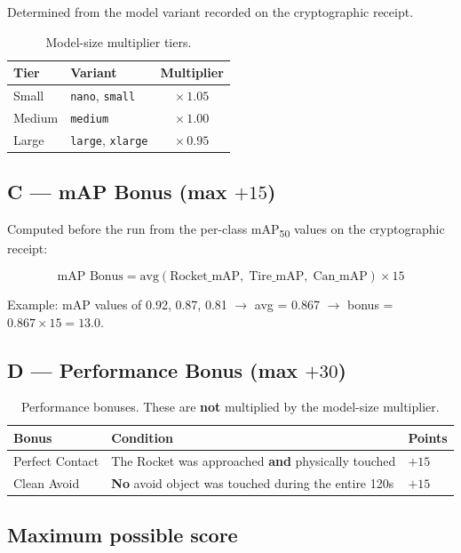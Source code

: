 \documentclass[a4]{article}
\begin{document}
Determined from the model variant recorded on the cryptographic receipt.

\begin{table}[H]
\centering
\begin{tabular}{llc}
\toprule
\textbf{Tier} & \textbf{Variant} & \textbf{Multiplier} \\
\midrule
Small & \texttt{nano}, \texttt{small} & $\times\,1.05$ \\
Medium & \texttt{medium} & $\times\,1.00$ \\
Large & \texttt{large}, \texttt{xlarge} & $\times\,0.95$ \\
\bottomrule
\end{tabular}
\caption{Model-size multiplier tiers.}
\end{table}

\subsection*{C --- mAP Bonus (max $+15$)}

Computed before the run from the per-class mAP\textsubscript{50} values on the cryptographic receipt:

\[
\text{mAP Bonus} = \text{avg}(\text{Rocket\_mAP},\; \text{Tire\_mAP},\; \text{Can\_mAP}) \times 15
\]

Example: mAP values of 0.92, 0.87, 0.81 $\rightarrow$ avg = 0.867 $\rightarrow$ bonus = $0.867 \times 15 = 13.0$.

\subsection*{D --- Performance Bonus (max $+30$)}

\begin{table}[H]
\centering
\begin{tabular}{lll}
\toprule
\textbf{Bonus} & \textbf{Condition} & \textbf{Points} \\
\midrule
Perfect Contact & The Rocket was approached \textbf{and} physically touched & $+15$ \\
Clean Avoid & \textbf{No} avoid object was touched during the entire 120s & $+15$ \\
\bottomrule
\end{tabular}
\caption{Performance bonuses. These are \textbf{not} multiplied by the model-size multiplier.}
\end{table}

\subsection*{Maximum possible score}
\end{document}
